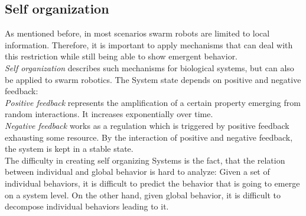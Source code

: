 \subsection{Self organization}
As mentioned before, in most scenarios swarm robots are limited to local information. Therefore, it is important to apply mechanisms that can deal with this restriction while still being able to show emergent behavior.\\
\emph{Self organization} describes such mechanisms for biological systems, but can also be applied to swarm robotics. The System state depends on positive and negative feedback:\\
\emph{Positive feedback} represents the amplification of a certain property emerging from random interactions. It increases exponentially over time.\\
\emph{Negative feedback} works as a regulation which is triggered by positive feedback exhausting some resource. By the interaction of positive and negative feedback, the system is kept in a stable state. \cite[pp. 11--20]{camazine2003self}\\
The difficulty in creating self organizing Systems is the fact, that the relation between individual and global behavior is hard to analyze: Given a set of individual behaviors, it is difficult to predict the
behavior that is going to emerge on a system level. On the other hand, given global behavior, it is difficult to decompose individual behaviors leading to it.

